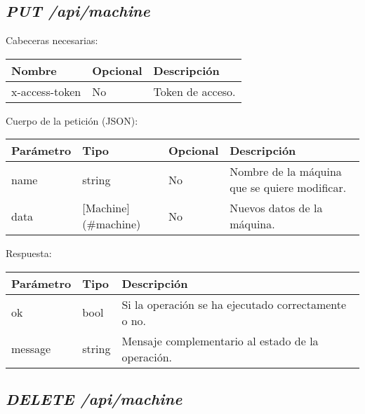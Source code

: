 \subsection{\textit{PUT /api/machine}}

Cabeceras necesarias:
\begin{table}[h!]
	\centering
	\begin{adjustbox}{max width=\textwidth}
	\begin{tabular}{|l|l|l|}
		\hline
		Nombre & Opcional & Descripción \\ \hline
		x-access-token & No & Token de acceso. \\ \hline
	\end{tabular}
\end{adjustbox}
\end{table}

Cuerpo de la petición (JSON):
\begin{table}[!h]
	\centering
	\begin{adjustbox}{max width=\textwidth}
	\begin{tabular}{|l|l|l|l|}
		\hline
		Parámetro & Tipo & Opcional & Descripción \\ \hline
		name & string & No & Nombre de la máquina que se quiere modificar. \\ \hline
		data & [Machine](\#machine) & No & Nuevos datos de la máquina. \\ \hline
	\end{tabular}
\end{adjustbox}
\end{table}


Respuesta:
\begin{table}[!h]
	\centering
	\begin{adjustbox}{max width=\textwidth}
	\begin{tabular}{|l|l|l|}
		\hline
		Parámetro & Tipo & Descripción \\ \hline
		ok & bool & Si la operación se ha ejecutado correctamente o no. \\ \hline
		message & string & Mensaje complementario al estado de la operación. \\ \hline
	\end{tabular}
\end{adjustbox}
\end{table}

\subsection{\textit{DELETE /api/machine}}

